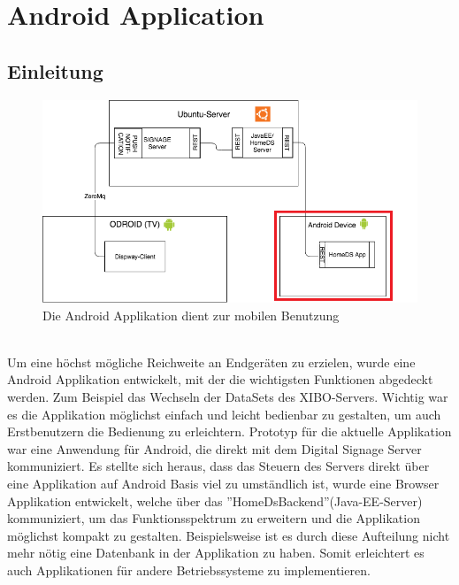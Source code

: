 \chapter{Android Application}
\section{Einleitung}

\begin{figure}[H]
\centering
\includegraphics[width=1.0\textwidth]{images/06_AndroidApp/06_SystemArch}
\caption{Die Android Applikation dient zur mobilen Benutzung}
\end{figure}
\\
Um eine höchst mögliche Reichweite an Endgeräten zu erzielen, wurde eine Android Applikation entwickelt, mit der die wichtigsten Funktionen abgedeckt werden. Zum Beispiel das Wechseln der DataSets des XIBO-Servers. Wichtig war es die Applikation möglichst einfach und leicht bedienbar zu gestalten, um auch Erstbenutzern die Bedienung zu erleichtern. 
Prototyp für die aktuelle Applikation war eine Anwendung für Android, die direkt mit dem Digital Signage Server kommuniziert. Es stellte sich heraus, dass das Steuern des Servers direkt über eine Applikation auf Android Basis viel zu umständlich ist, wurde eine Browser Applikation entwickelt, welche über das ''HomeDsBackend''(Java-EE-Server) kommuniziert, um das Funktionsspektrum zu erweitern und die Applikation möglichst kompakt zu gestalten. Beispielsweise ist es durch diese Aufteilung nicht mehr nötig eine Datenbank in der Applikation zu haben. Somit erleichtert es auch Applikationen für andere Betriebssysteme zu implementieren. 
